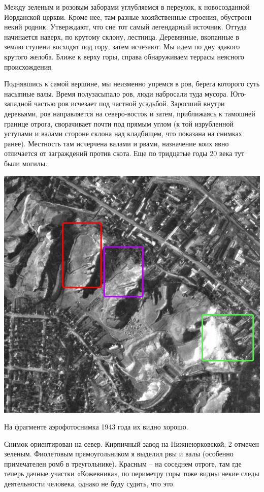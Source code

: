 Между зеленым и розовым заборами углубляемся в переулок, к новосозданной Иорданской церкви. Кроме нее, там разные хозяйственные строения, обустроен некий родник. Утверждают, что сие тот самый легендарный источник. Оттуда начинается наверх, по крутому склону, лестница. Деревянные, вкопанные в землю ступени восходят под гору, затем исчезают. Мы идем по дну эдакого крутого желоба. Ближе к верху горы, справа обнаруживаем террасы неясного происхождения.

Поднявшись к самой вершине, мы неизменно упремся в ров, берега которого суть насыпные валы. Время полузасыпало ров, люди набросали туда мусора. Юго-западной частью ров исчезает под частной усадьбой. Заросший внутри деревьями, ров направляется на северо-восток и затем, приближаясь к тамошней границе отрога, сворачивает почти под прямым углом (к той изрубленной уступами и валами стороне склона над кладбищем, что показана на снимках ранее). Местность там исчерчена валами и рвами, назначение коих явно отличается от заграждений против скота. Еще по тридцатые годы 20 века тут были могилы.

\begin{center}
\includegraphics[width=\linewidth]{chast-kirvys/lys02/rvy-n.png}
\end{center}

На фрагменте аэрофотоснимка 1943 года их видно хорошо.

Снимок ориентирован на север. Кирпичный завод на Нижнеюрковской, 2 отмечен зеленым. Фиолетовым прямоугольником я выделил рвы и валы (особенно примечателен ромб в треугольнике). Красным – на соседнем отроге, там где теперь дачные участки «Кожевника», по периметру горы тоже видны некие следы деятельности человека, однако не буду судить, что это.

